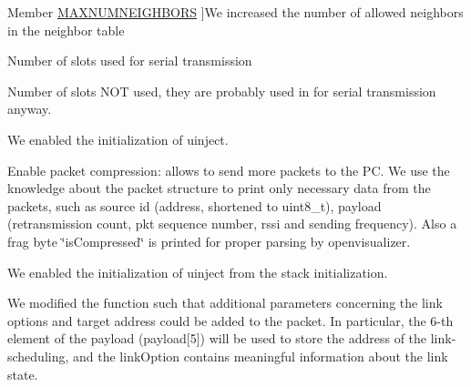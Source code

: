 \begin{DoxyRefList}
\hypertarget{_l_k_n_code_edits__LKN_code_edits000017}{}%
Member \hyperlink{group___neighbors_gaf83606573bb704d34705b540c226a0d9}{M\+A\+X\+N\+U\+M\+N\+E\+I\+G\+H\+B\+O\+RS} ]We increased the number of allowed neighbors in the neighbor table  
\item[\label{_l_k_n_code_edits__LKN_code_edits000023}%
\hypertarget{_l_k_n_code_edits__LKN_code_edits000023}{}%
Member \hyperlink{group___schedule_ga5206eabfac75eeed6f5066fb6d00f7c3}{N\+U\+M\+S\+E\+R\+I\+A\+L\+RX} ]Number of slots used for serial transmission  
\item[\label{_l_k_n_code_edits__LKN_code_edits000024}%
\hypertarget{_l_k_n_code_edits__LKN_code_edits000024}{}%
Member \hyperlink{group___schedule_ga9fd457940c2d1313fb347b5fd32d2105}{N\+U\+M\+S\+L\+O\+T\+S\+O\+FF} ]Number of slots N\+OT used, they are probably used in for serial transmission anyway.  
\item[\label{_l_k_n_code_edits__LKN_code_edits000005}%
\hypertarget{_l_k_n_code_edits__LKN_code_edits000005}{}%
Member \hyperlink{03oos__macpong_8c_a1de6d1ec345a723478a2e1b8e049977a}{openapps\+\_\+init} (void)]We enabled the initialization of uinject.  
\item[\label{_l_k_n_code_edits__LKN_code_edits000002}%
\hypertarget{_l_k_n_code_edits__LKN_code_edits000002}{}%
Member \hyperlink{group___open_serial_ga773cc9fae5d0477d9eed107dce419c33}{openserial\+\_\+print\+Data} (uint8\+\_\+t $\ast$buffer, uint8\+\_\+t length)]Enable packet compression\+: allows to send more packets to the PC. We use the knowledge about the packet structure to print only necessary data from the packets, such as source id (address, shortened to uint8\+\_\+t), payload (retransmission count, pkt sequence number, rssi and sending frequency). Also a frag byte \char`\"{}is\+Compressed\char`\"{} is printed for proper parsing by openvisualizer.  
\item[\label{_l_k_n_code_edits__LKN_code_edits000029}%
\hypertarget{_l_k_n_code_edits__LKN_code_edits000029}{}%
Member \hyperlink{openstack_8h_a1aff0d46d66b585598f5d467ef0da799}{openstack\+\_\+init} (void)]We enabled the initialization of uinject from the stack initialization.  
\item[\label{_l_k_n_code_edits__LKN_code_edits000018}%
\hypertarget{_l_k_n_code_edits__LKN_code_edits000018}{}%
Member \hyperlink{process_i_e_8h_a222b2d57ad09b945b098f211cd159e53}{process\+I\+E\+\_\+prepend\+Slotframe\+Link\+IE} (\hyperlink{struct_open_queue_entry__t}{Open\+Queue\+Entry\+\_\+t} $\ast$pkt)]We modified the function such that additional parameters concerning the link options and target address could be added to the packet. In particular, the 6-\/th element of the payload (payload\mbox{[}5\mbox{]}) will be used to store the address of the link-\/scheduling, and the link\+Option contains meaningful information about the link state. 

\end{DoxyRefList}
